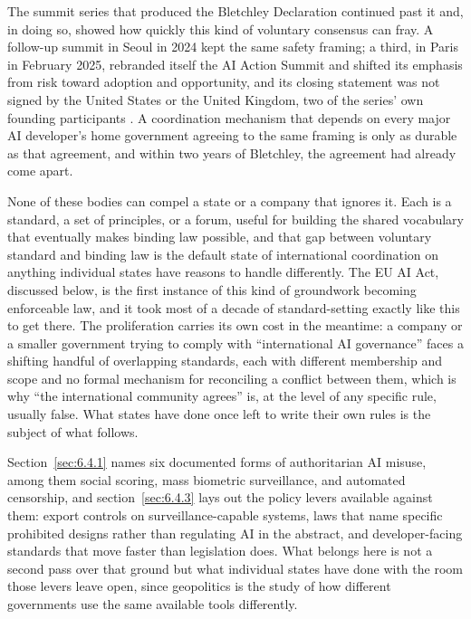 The summit series that produced the Bletchley Declaration continued past it and, in doing so, showed how quickly this kind of voluntary consensus can fray. A follow-up summit in Seoul in 2024 kept the same safety framing; a third, in Paris in February 2025, rebranded itself the AI Action Summit and shifted its emphasis from risk toward adoption and opportunity, and its closing statement was not signed by the United States or the United Kingdom, two of the series' own founding participants \autocite{aiactionsummit2025paris}. A coordination mechanism that depends on every major AI developer's home government agreeing to the same framing is only as durable as that agreement, and within two years of Bletchley, the agreement had already come apart.

None of these bodies can compel a state or a company that ignores it. Each is a standard, a set of principles, or a forum, useful for building the shared vocabulary that eventually makes binding law possible, and that gap between voluntary standard and binding law is the default state of international coordination on anything individual states have reasons to handle differently. The EU AI Act, discussed below, is the first instance of this kind of groundwork becoming enforceable law, and it took most of a decade of standard-setting exactly like this to get there. The proliferation carries its own cost in the meantime: a company or a smaller government trying to comply with “international AI governance” faces a shifting handful of overlapping standards, each with different membership and scope and no formal mechanism for reconciling a conflict between them, which is why “the international community agrees” is, at the level of any specific rule, usually false. What states have done once left to write their own rules is the subject of what follows.

Section~\ref{sec:6.4.1} names six documented forms of authoritarian AI misuse, among them social scoring, mass biometric surveillance, and automated censorship, and section~\ref{sec:6.4.3} lays out the policy levers available against them: export controls on surveillance-capable systems, laws that name specific prohibited designs rather than regulating AI in the abstract, and developer-facing standards that move faster than legislation does. What belongs here is not a second pass over that ground but what individual states have done with the room those levers leave open, since geopolitics is the study of how different governments use the same available tools differently.

